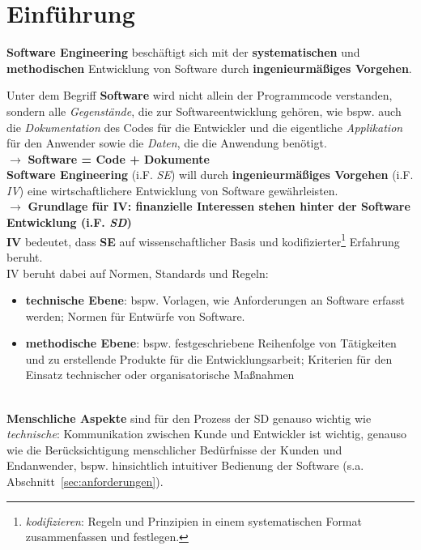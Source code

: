 \section{Einführung}

\begin{tcolorbox}[title={Software Engineering}]
    \textbf{Software Engineering} beschäftigt sich mit der \textbf{systematischen} und \textbf{methodischen} Entwicklung von Software durch \textbf{ingenieurmäßiges Vorgehen}.
\end{tcolorbox}

\noindent
Unter dem Begriff \textbf{Software} wird nicht allein der Programmcode verstanden, sondern alle \textit{Gegenstände}, die zur Softwareentwicklung gehören, wie bspw. auch die \textit{Dokumentation} des Codes für die Entwickler und die eigentliche \textit{Applikation} für den Anwender sowie die \textit{Daten}, die die Anwendung benötigt.\\
$\rightarrow$ \textbf{Software = Code + Dokumente}\\


\noindent
\textbf{Software Engineering} (i.F. \textit{SE}) will durch \textbf{ingenieurmäßiges Vorgehen} (i.F. \textit{IV}) eine wirtschaftlichere Entwicklung von Software gewährleisten.\\
$\rightarrow$ \textbf{Grundlage für IV: finanzielle Interessen stehen hinter der Software Entwicklung (i.F. \textit{SD})}\\

\noindent
\textbf{IV} bedeutet, dass \textbf{SE} auf wissenschaftlicher Basis und kodifizierter\footnote{
\textit{kodifizieren}: Regeln und Prinzipien in einem systematischen Format zusammenfassen und festlegen.
} Erfahrung beruht.\\

\noindent
IV beruht dabei auf Normen, Standards und Regeln:

\begin{itemize}
    \item\textbf{technische Ebene}: bspw. Vorlagen, wie Anforderungen an Software erfasst werden; Normen für Entwürfe von Software.
    \item \textbf{methodische Ebene}: bspw. festgeschriebene Reihenfolge von Tätigkeiten und zu erstellende Produkte für die Entwicklungsarbeit; Kriterien für den Einsatz technischer oder organisatorische Maßnahmen
\end{itemize}\\

\noindent
\textbf{Menschliche Aspekte} sind für den Prozess der SD genauso wichtig wie \textit{technische}: Kommunikation zwischen Kunde und Entwickler ist wichtig, genauso wie die Berücksichtigung menschlicher Bedürfnisse der Kunden und Endanwender, bspw. hinsichtlich intuitiver Bedienung der Software (s.a. Abschnitt~\ref{sec:anforderungen}).
